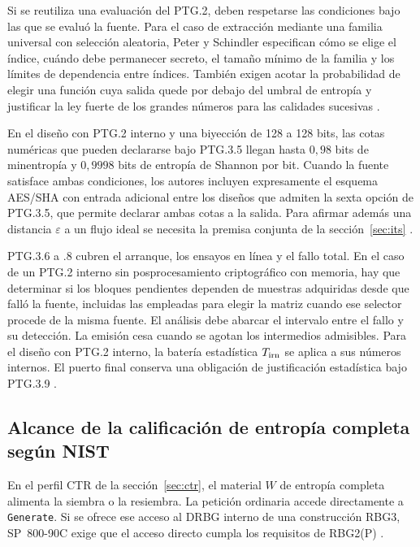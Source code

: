 \documentclass[11pt,a4paper]{article}
\begin{document}
Si se reutiliza una evaluación del PTG.2, deben respetarse las condiciones bajo las que se evaluó la fuente. Para el caso de extracción mediante una familia universal con selección aleatoria, Peter y Schindler especifican cómo se elige el índice, cuándo debe permanecer secreto, el tamaño mínimo de la familia y los límites de dependencia entre índices. También exigen acotar la probabilidad de elegir una función cuya salida quede por debajo del umbral de entropía y justificar la ley fuerte de los grandes números para las calidades sucesivas \cite[párrs.~338(a)--(f) y 401]{ais}.

En el diseño con PTG.2 interno y una biyección de 128 a 128 bits, las cotas numéricas que pueden declararse bajo PTG.3.5 llegan hasta \(0{,}98\) bits de minentropía y \(0{,}9998\) bits de entropía de Shannon por bit. Cuando la fuente satisface ambas condiciones, los autores incluyen expresamente el esquema AES/SHA con entrada adicional entre los diseños que admiten la sexta opción de PTG.3.5, que permite declarar ambas cotas a la salida. Para afirmar además una distancia \(\varepsilon\) a un flujo ideal se necesita la premisa conjunta de la sección~\ref{sec:its} \cite[párrs.~375, 390(iii) y 397--399]{ais}.

PTG.3.6 a .8 cubren el arranque, los ensayos en línea y el fallo total. En el caso de un PTG.2 interno sin posprocesamiento criptográfico con memoria, hay que determinar si los bloques pendientes dependen de muestras adquiridas desde que falló la fuente, incluidas las empleadas para elegir la matriz cuando ese selector procede de la misma fuente. El análisis debe abarcar el intervalo entre el fallo y su detección. La emisión cesa cuando se agotan los intermedios admisibles. Para el diseño con PTG.2 interno, la batería estadística \(T_{\rm irn}\) se aplica a sus números internos. El puerto final conserva una obligación de justificación estadística bajo PTG.3.9 \cite[párrs.~200, 375, 417, caso~1, y 422--423]{ais}.

\subsection{Alcance de la calificación de entropía completa según NIST}
En el perfil CTR de la sección~\ref{sec:ctr}, el material \(W\) de entropía completa alimenta la siembra o la resiembra. La petición ordinaria accede directamente a \texttt{Generate}. Si se ofrece ese acceso al DRBG interno de una construcción RBG3, SP~800-90C exige que el acceso directo cumpla los requisitos de RBG2(P) \cite[secs.~5.3 y 6.3, requisito~8]{nist90c}.
\end{document}
